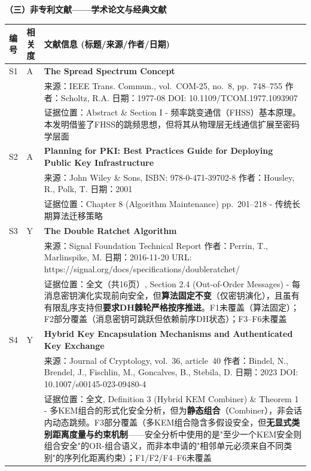 \documentclass[12pt,a4paper]{article}
\begin{document}
\textbf{（三）非专利文献——学术论文与经典文献}


\begin{longtable}{|p{1.2cm}|p{1.8cm}|p{11.6cm}|}
\hline
\textbf{编号} & \textbf{相关度} & \textbf{文献信息 (标题/来源/作者/日期)} \\
\hline

S1 & A & \textbf{The Spread Spectrum Concept} \\
& & 来源：IEEE Trans. Commun., vol.~COM-25, no.~8, pp.~748--755 \quad 作者：Scholtz, R.A. \quad 日期：1977-08 \quad DOI: 10.1109/TCOM.1977.1093907 \\
& & 证据位置：Abstract \& Section I - 频率跳变通信（FHSS）基本原理。本发明借鉴了FHSS的跳频思想，但将其从物理层无线通信扩展至密码学层面 \\
\hline
S2 & A & \textbf{Planning for PKI: Best Practices Guide for Deploying Public Key Infrastructure} \\
& & 来源：John Wiley \& Sons, ISBN: 978-0-471-39702-8 \quad 作者：Housley, R., Polk, T. \quad 日期：2001 \\
& & 证据位置：Chapter 8 (Algorithm Maintenance) pp.~201--218 - 传统长期算法迁移策略 \\
\hline
S3 & Y & \textbf{The Double Ratchet Algorithm} \\
& & 来源：Signal Foundation Technical Report \quad 作者：Perrin, T., Marlinspike, M. \quad 日期：2016-11-20 \quad URL: https://signal.org/docs/specifications/doubleratchet/ \\
& & 证据位置：全文（共16页）, Section 2.4 (Out-of-Order Messages) - 每消息密钥演化实现前向安全，但\textbf{算法固定不变}（仅密钥演化），且虽有有限乱序支持但\textbf{要求DH棘轮严格按序推进}。F1未覆盖（算法固定）；F2部分覆盖（消息密钥可跳跃但依赖前序DH状态）；F3--F6未覆盖 \\
\hline
S4 & Y & \textbf{Hybrid Key Encapsulation Mechanisms and Authenticated Key Exchange} \\
& & 来源：Journal of Cryptology, vol.~36, article~40 \quad 作者：Bindel, N., Brendel, J., Fischlin, M., Goncalves, B., Stebila, D. \quad 日期：2023 \quad DOI: 10.1007/s00145-023-09480-4 \\
& & 证据位置：全文, Definition 3 (Hybrid KEM Combiner) \& Theorem 1 - 多KEM组合的形式化安全分析，但为\textbf{静态组合}（Combiner），非会话内动态跳频。F3部分覆盖（多KEM组合隐含多假设安全，但\textbf{无显式类别距离度量与约束机制}——安全分析中使用的是"至少一个KEM安全则组合安全"的OR-组合语义，而非本申请的"相邻单元必须来自不同类别"的序列化距离约束）；F1/F2/F4--F6未覆盖 \\

\end{longtable}
\end{document}
